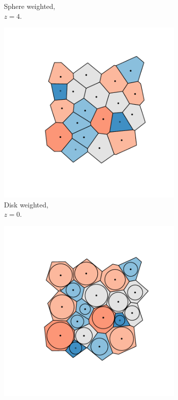 \begin{figure}[tb]
\begin{subfigure}[b]{0.23\textwidth}
         \caption{Sphere weighted, \\$z=4$.}
         \label{fig:cut40a}
     \end{subfigure}
     \hfill
     \vspace{0.5cm}
     
      \begin{subfigure}[b]{0.23\textwidth}
         \centering
         \includegraphics[width=\textwidth]{./figures/quasi2d/cut_z0_b.pdf}
         \caption{Disk weighted, \\$z=0$.}
         \label{fig:cut0b}
     \end{subfigure}
     \hfill
      \begin{subfigure}[b]{0.23\textwidth}
         \centering
         \includegraphics[width=\textwidth]{./figures/quasi2d/cut_z10_b.pdf}

\end{subfigure}
\end{figure}
